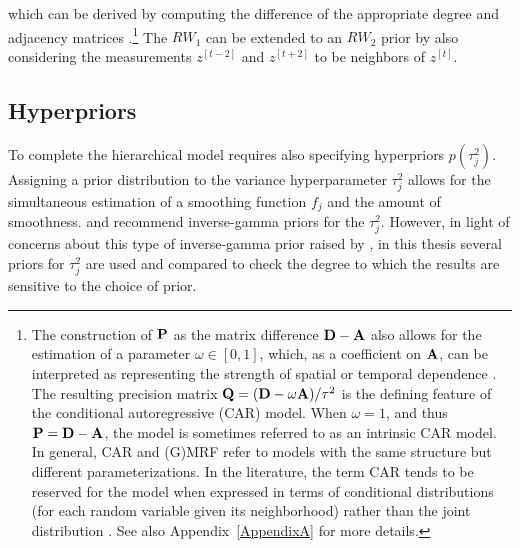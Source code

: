 \noindent which can be derived by computing the difference of the appropriate degree 
and adjacency matrices .\footnote{The construction 
of $\mathbf{P}$ as the matrix difference $\mathbf{D} - \mathbf{A}$ also allows for the estimation 
of a parameter $\omega \in [0,1]$, which, as a coefficient on $\mathbf{A}$, can be 
interpreted as representing the strength of spatial or temporal dependence 
. The resulting precision matrix 
$\mathbf{Q}= (\mathbf{D} - \omega \mathbf{A})/\tau^2$ is the defining feature of the conditional 
autoregressive (CAR) model.  When $\omega = 1$, and thus $\mathbf{P}= \mathbf{D} - \mathbf{A}$, 
the model is sometimes referred to as an intrinsic CAR model. In general, CAR and (G)MRF 
refer to models with the same structure but different parameterizations. In the literature, the 
term CAR tends to be reserved for the model when expressed in terms of conditional 
distributions (for each random variable given its neighborhood) rather than the joint distribution . 
See also Appendix~\ref{AppendixA} for more details.\label{footnote_car}} 
The $RW_1$ can be extended to an $RW_2$ prior by also considering the 
measurements $z^{[t-2]}$  and $z^{[t+2]}$ to be neighbors of $z^{[t]}$. 


\subsection{Hyperpriors}
\label{hyperpriors}

To complete the hierarchical model requires also specifying hyperpriors $p(\tau_j^2)$.  
Assigning a prior distribution to the variance hyperparameter $\tau_j^2$ allows for the 
simultaneous estimation of a smoothing function $f_j$ and the amount of smoothness.
  and  recommend  
 inverse-gamma priors for the $\tau_j^2$. However, in light of concerns about this type 
 of inverse-gamma prior raised by , in this thesis several priors 
 for $\tau^2_j$ are used and compared to check the degree to which the results are sensitive 
 to the choice of prior.

